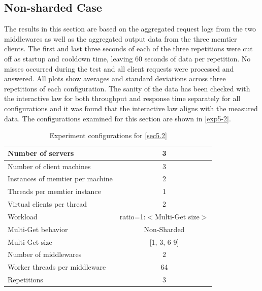 \documentclass[11pt,a4paper]{article}
\begin{document}
\subsection{Non-sharded Case} \label{sec5.2}
The results in this section are based on the aggregated request logs from the two middlewares as well as the aggregated output data from the three memtier clients. The first and last three seconds of each of the three repetitions were cut off as startup and cooldown time, leaving 60 seconds of data per repetition. No misses occurred during the test and all client requests were processed and answered. All plots show averages and standard deviations across three repetitions of each configuration. The sanity of the data has been checked with the interactive law for both throughput and response time separately for all configurations and it was found that the interactive law aligns with the measured data. The configurations examined for this section are shown in \autoref{exp5-2}.

\begin{center}
    \begin{table}
        \centering
    	\begin{tabular}{|l|c|}
    		\hline Number of servers                & 3                            \\ 
    		\hline Number of client machines        & 3                            \\ 
    		\hline Instances of memtier per machine & 2                            \\ 
    		\hline Threads per memtier instance     & 1                            \\
    		\hline Virtual clients per thread       & 2                		       \\ 
    		\hline Workload                         & ratio=1:$<$Multi-Get size$>$ \\
    		\hline Multi-Get behavior               & Non-Sharded                  \\
    		\hline Multi-Get size                   & [1, 3, 6 9]                  \\
    		\hline Number of middlewares            & 2                            \\
    		\hline Worker threads per middleware    & 64                           \\
    		\hline Repetitions                      & 3                            \\ 
    		\hline 
    	\end{tabular}
    	\caption{Experiment configurations for \autoref{sec5.2}} \label{exp5-2}
    \end{table}
\end{center}
\end{document}
